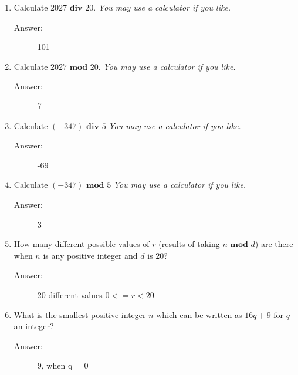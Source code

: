\documentclass[12pt, oneside]{article}
\begin{document}
\begin{enumerate}
\begin{enumerate}
\item Calculate $2027 \textbf{ div } 20$.  {\it You may use a calculator if you like.}
\begin{description}
  \item[Answer:] 101
\end{description}
\item Calculate $2027 \textbf{ mod } 20$.  {\it You may use a calculator if you like.}
\begin{description}
  \item[Answer:] 7
\end{description}
\item Calculate $(-347) \textbf{ div } 5$ {\it You may use a calculator if you like.}
\begin{description}
  \item[Answer:] -69
\end{description}
\item Calculate $(-347) \textbf{ mod } 5$ {\it You may use a calculator if you like.}
\begin{description}
  \item[Answer:] 3
\end{description}
\item How many different possible values of $r$ (results of taking $n \textbf{ mod } d$) are there when 
$n$ is any positive integer and $d$ is $20$?
\begin{description}
  \item[Answer:] 20 different values $0 <= r < 20$
\end{description}
\item What is the smallest positive integer $n$ which can be written as $16q+9$ for $q$ an integer?
\begin{description}
  \item[Answer:] 9, when q = 0
\end{description}
\end{enumerate}


\end{enumerate}
\end{document}
